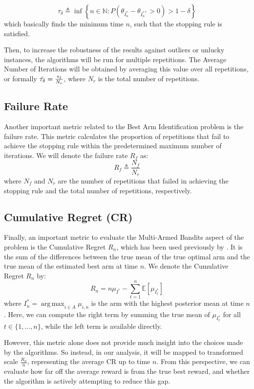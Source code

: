 \documentclass[a4paper, 12pt]{article}
\DeclareMathOperator{\argmax}{arg\,max}
\theoremstyle{definition}
\begin{document}
\[
\tau_\delta\triangleq \inf\left\{n\in\mathbb{N}:P\left(\theta_{I_n^*}-\theta_{I_n^{**}} > 0\right) > 1-\delta\right\}
\]
which basically finds the minimum time $n$, such that the stopping rule is satisfied. 

Then, to increase the robustness of the results against outliers or unlucky instances, the algorithms will be run for multiple repetitions. The Average Number of Iterations will be obtained by averaging this value over all repetitions, or formally $\Bar{\tau_\delta} = \frac{\tau_\delta}{N_r}$, where $N_r$ is the total number of repetitions.

\subsection{Failure Rate}
Another important metric related to the Best Arm Identification problem is the failure rate. This metric calculates the proportion of repetitions that fail to achieve the stopping rule within the predetermined maximum number of iterations. We will denote the failure rate $R_f$ as:
\[
R_f \triangleq \frac{N_f}{N_r}
\]
where $N_f$ and $N_r$ are the number of repetitions that failed in achieving the stopping rule and the total number of repetitions, respectively.

\subsection{Cumulative Regret (CR)}
Finally, an important metric to evaluate the Multi-Armed Bandits aspect of the problem is the Cumulative Regret $R_n$, which has been used previously by \cite{ucb}. It is the sum of the differences between the true mean of the true optimal arm and the true mean of the estimated best arm at time $n$. We denote the Cumulative Regret $R_n$ by:
\[
R_n = n\mu_{I^*} - \sum_{t=1}^{n} \mathbb{E}\left[\mu_{I_t^*}\right] 
\]
where $I_n^* = \argmax_{i\in A}\mu_{i,n}$ is the arm with the highest posterior mean at time $n$. Here, we can compute the right term by summing the true mean of $\mu_{I_t^*}$ for all $t \in \{1, ..., n\}$, while the left term is available directly.

However, this metric alone does not provide much insight into the choices made by the algorithms. So instead, in our analysis, it will be mapped to transformed scale $\frac{R_n}{n}$, representing the average CR up to time $n$. From this perspective, we can evaluate how far off the average reward is from the true best reward, and whether the algorithm is actively attempting to reduce this gap.
\end{document}
